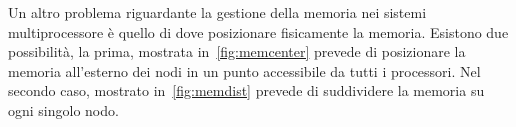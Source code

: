 Un altro problema riguardante la gestione della memoria nei sistemi multiprocessore è quello di dove posizionare fisicamente la memoria. Esistono due possibilità, la prima, mostrata in \figurename\,\ref{fig:memcenter} prevede di posizionare la memoria all'esterno dei nodi in un punto accessibile da tutti i processori. Nel secondo caso, mostrato in \figurename\,\ref{fig:memdist} prevede di suddividere la memoria su ogni singolo nodo.\\
\begin{figure}[htb]
\centering
{}
\end{figure}
